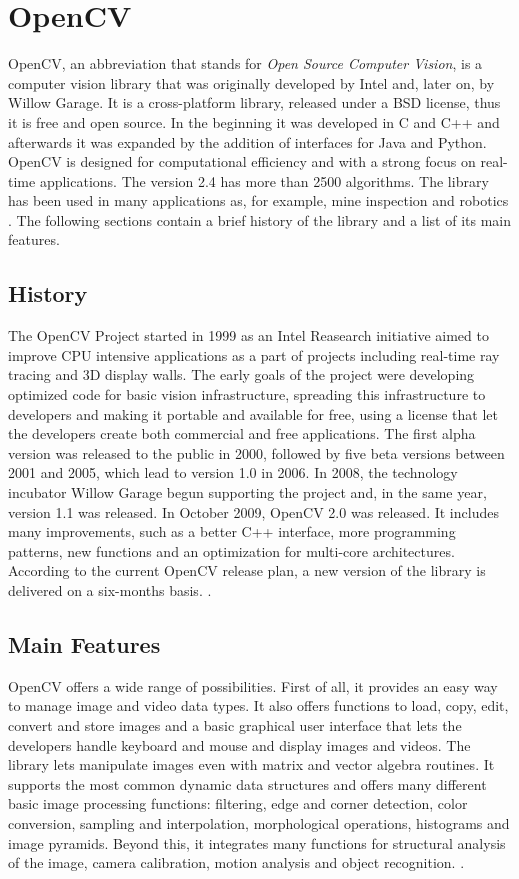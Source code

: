   \section{OpenCV}
	\mbox{OpenCV}, an abbreviation that stands for \emph{Open Source Computer Vision}, is a computer vision library that was originally developed by Intel and, later on, by Willow Garage.
	It is a cross-platform library, released under a BSD license, thus it is free and open source. In the beginning it was developed in C and C++ and afterwards it was expanded by the addition of interfaces for Java and Python. \mbox{OpenCV} is designed for computational efficiency and with a strong focus on real-time applications. The version 2.4 has more than 2500 algorithms. The library has been used in many applications as, for example, mine inspection and robotics \cite{OpenCV:MainWebPage}. The following sections contain a brief history of the library and a list of its main features.
		
	\subsection*{History}
	The \mbox{OpenCV} Project started in 1999 as an Intel Reasearch initiative aimed to improve CPU intensive applications as a part of projects including real-time ray tracing and 3D display walls. The early goals of the project were developing optimized code for basic vision infrastructure, spreading this infrastructure to developers and making it portable and available for free, using a license that let the developers create both commercial and free applications.\newline
	The first alpha version was released to the public in 2000, followed by five beta versions between 2001 and 2005, which lead to version 1.0 in 2006. In 2008, the technology incubator Willow Garage begun supporting the project and, in the same year, version 1.1  was released.
	In October 2009, \mbox{OpenCV} 2.0 was released. It includes many improvements, such as a better C++ interface, more programming patterns, new functions and an optimization for multi-core architectures. According to the current \mbox{OpenCV} release plan, a new version of the library is delivered on a six-months basis. \cite{OpenCV:ChangeLogs}.
	
	\subsection*{Main Features}
	\mbox{OpenCV} offers a wide range of possibilities. First of all, it provides an easy way to manage image and video data types. It also offers functions to load, copy, edit, convert and store images and a basic graphical user interface that lets  the developers handle keyboard and mouse and display images and videos. The library lets manipulate images even with matrix and vector algebra routines. It supports the most common dynamic data structures and offers many different basic image processing functions: filtering, edge and corner detection, color conversion, sampling and interpolation, morphological operations, histograms and image pyramids. Beyond this, it integrates many functions for structural analysis of the image, camera calibration, motion analysis and object recognition. \cite{Agam2006}.
